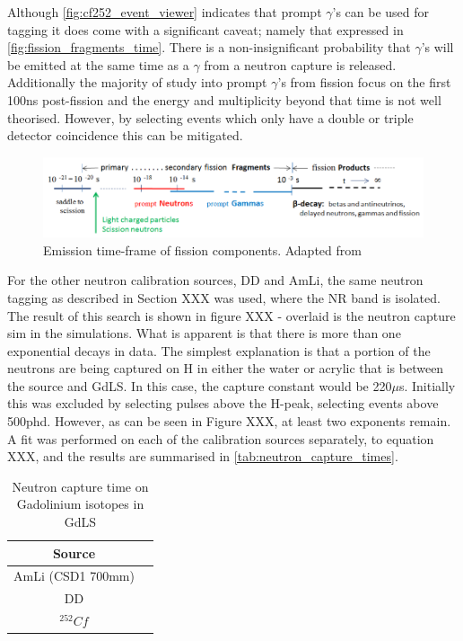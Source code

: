 \par
Although \autoref{fig:cf252_event_viewer} indicates that prompt $\gamma$'s can be used for tagging it does come with a significant caveat; namely that expressed in \autoref{fig:fission_fragments_time}.
There is a non-insignificant probability that $\gamma$'s will be emitted at the same time as a $\gamma$ from a neutron capture is released.
Additionally the majority of study into prompt $\gamma$'s from fission focus on the first 100ns post-fission and the energy and multiplicity beyond that time is not well theorised. 
However, by selecting events which only have a double or triple detector coincidence this can be mitigated.


\begin{figure}[!htbp]
\includegraphics[width=13cm]{Figures/NeutronCaptureTime/fission_fragment_times.png}
\centering
\caption{Emission time-frame of fission components. Adapted from \cite{cf252_fission_ref}}
\label{fig:fission_fragments_time}
\end{figure}



\par
For the other neutron calibration sources, DD and AmLi, the same neutron tagging as described in Section XXX was used, where the NR band is isolated.
The result of this search is shown in figure XXX - overlaid is the neutron capture sim in the simulations.
What is apparent is that there is more than one exponential decays in data.
The simplest explanation is that a portion of the neutrons are being captured on H in either the water or acrylic that is between the source and GdLS.
In this case, the capture constant would be 220$\mu$s.
Initially this was excluded by selecting pulses above the H-peak, selecting events above 500phd.
However, as can be seen in Figure XXX, at least two exponents remain.
A fit was performed on each of the calibration sources separately, to equation XXX, and the results are summarised in \autoref{tab:neutron_capture_times}.
\begin{table}[!htbp]
    \centering
    \begin{tabular}{c|c}
        Source            &  \\ \hline
        AmLi (CSD1 700mm) & \\ 
        DD                & \\
        ${}^{252}{Cf}$    &
    \end{tabular}
    \caption{Neutron capture time on Gadolinium isotopes in GdLS}
    \label{tab:neutron_capture_times}
\end{table}

